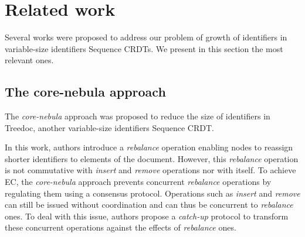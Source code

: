 \documentclass[10pt,journal,compsoc]{IEEEtran}
\begin{document}


\section{Related work}
\label{sec:related-work}

Several works were proposed to address our problem of growth of identifiers in variable-size identifiers Sequence \acp{CRDT}.
We present in this section the most relevant ones.

\subsection{The core-nebula approach}
\label{sec:core-nebula}

The \emph{core-nebula} approach \cite{letia:hal-01248270, zawirski:hal-01248197} was proposed to reduce the size of identifiers in Treedoc\cite{5158449}, another variable-size identifiers Sequence \ac{CRDT}.

In this work, authors introduce a \emph{rebalance} operation enabling nodes to reassign shorter identifiers to elements of the document.
However, this \emph{rebalance} operation is not commutative with \emph{insert} and \emph{remove} operations nor with itself.
To achieve \ac{EC}\cite{10.1145/224057.224070}, the \emph{core-nebula} approach prevents concurrent \emph{rebalance} operations by regulating them using a consensus protocol.
Operations such as \emph{insert} and \emph{remove} can still be issued without coordination and can thus be concurrent to \emph{rebalance} ones.
To deal with this issue, authors propose a \emph{catch-up} protocol to transform these concurrent operations against the effects of \emph{rebalance} ones.
\end{document}
